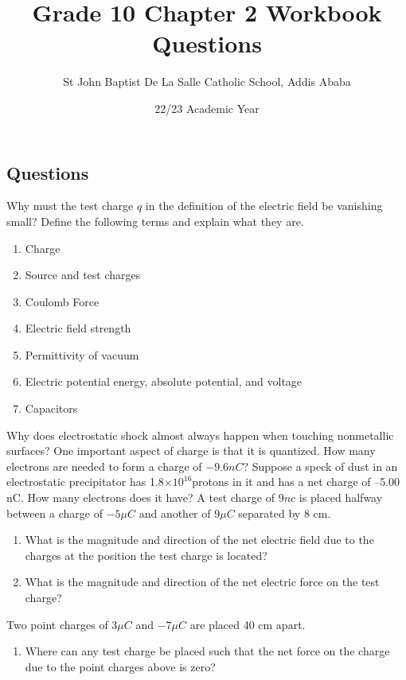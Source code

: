 \documentclass[12pt,addpoints]{exam}
\author{St John Baptist De La Salle Catholic School, Addis Ababa}
\date{22/23 Academic Year}
\begin{document}
	\title{Grade 10 Chapter 2 Workbook Questions}
	\maketitle
	
	\begin{center}
		\subsection*{Questions}
	\end{center}
	
	
	\begin{questions}
		\question Why must the test charge $q$ in the definition of the electric field be vanishing small?
		\question Define the following terms and explain what they are.
		\begin{enumerate}[label=(\roman*)]
			\item Charge
			\item Source and test charges
			\item Coulomb Force
			\item Electric field strength
			\item Permittivity of vacuum
			\item Electric potential energy, absolute potential, and voltage
			\item Capacitors
		\end{enumerate}
		\question Why does electrostatic shock almost always happen when touching nonmetallic surfaces?
		\question One important aspect of charge is that it is quantized. How many electrons are needed to form a charge of $-9.6nC$?
		\question Suppose a speck of dust in an electrostatic precipitator has 1.8$\times10^{16}$protons in it and has a net charge of –5.00 nC. How many electrons does it have?
		\question A test charge of $9nc$ is placed halfway between a charge of $-5\mu C$ and another of $9\mu C$ separated by 8 cm.
		\begin{enumerate}[label=(\roman*)]
			\item What is the magnitude and direction of the net electric field due to the charges at the position the test charge is located?
			\item What is the magnitude and direction of the net electric force on the test charge?
		\end{enumerate}
		\question Two point charges of $3\mu C$ and $-7 \mu C$ are placed 40 cm apart.
		\begin{enumerate}[label=(\roman*)]
			\item Where can any test charge be placed such that the net force on the charge due to the point charges above is zero?

\end{enumerate}
\end{questions}
\end{document}

